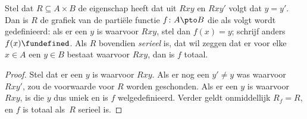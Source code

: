 \documentclass[../../../include/open-logic-section]{subfiles}
\begin{document}
\begin{prop}
Stel dat $R \subseteq A \times B$ de eigenschap heeft dat uit $Rxy$ en
$Rxy'$ volgt dat $y = y'$. Dan is $R$ de grafiek van de partiële
functie $f\colon A \pto B$ die als volgt wordt gedefinieerd: als er een
$y$ is waarvoor $Rxy$, stel dan $f(x) = y$; schrijf anders $f(x)
\fundefined$. Als $R$ bovendien \emph{serieel} is, dat wil zeggen dat
er voor elke $x \in A$ een $y \in B$ bestaat waarvoor $Rxy$, dan is
$f$ totaal.
\end{prop}

\begin{proof}
Stel dat er een $y$ is waarvoor $Rxy$. Als er nog een $y' \neq y$ was
waarvoor $Rxy'$, zou de voorwaarde voor $R$ worden geschonden. Als er
een $y$ is waarvoor $Rxy$, is die $y$ dus uniek en is $f$
welgedefinieerd. Verder geldt onmiddellijk $R_f = R$, en $f$ is totaal
als~$R$ serieel is.
\end{proof}
\end{document}
